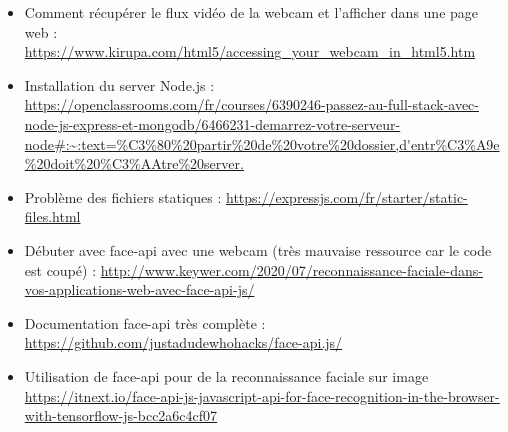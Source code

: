 \begin{itemize}
    \item Comment récupérer le flux vidéo de la webcam et l'afficher dans une page web : 
    \url{https://www.kirupa.com/html5/accessing_your_webcam_in_html5.htm}
    \item Installation du server Node.js :
    \url{https://openclassrooms.com/fr/courses/6390246-passez-au-full-stack-avec-node-js-express-et-mongodb/6466231-demarrez-votre-serveur-node#:~:text=%C3%80%20partir%20de%20votre%20dossier,d'entr%C3%A9e%20doit%20%C3%AAtre%20server.}
    \item Problème des fichiers statiques :
    \url{https://expressjs.com/fr/starter/static-files.html}
    \item Débuter avec face-api avec une webcam (très mauvaise ressource car le code est coupé) :
    \url{http://www.keywer.com/2020/07/reconnaissance-faciale-dans-vos-applications-web-avec-face-api-js/}
    \item Documentation face-api très complète :
    \url{https://github.com/justadudewhohacks/face-api.js/}  
    \item Utilisation de face-api pour de la reconnaissance faciale sur image
    \url{https://itnext.io/face-api-js-javascript-api-for-face-recognition-in-the-browser-with-tensorflow-js-bcc2a6c4cf07}
\end{itemize}